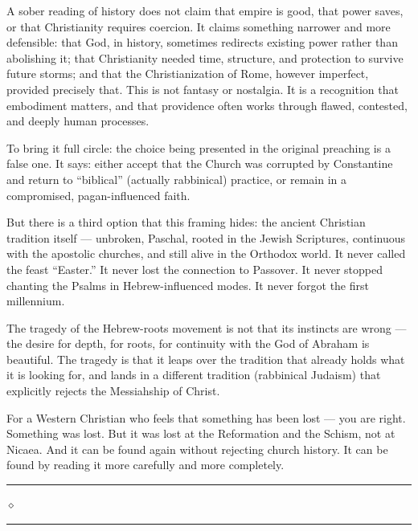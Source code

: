\documentclass[10pt,twoside,openany]{book}
\newcommand{\ornrule}{%
  \par\bigskip
  {\noindent\hfil{\color{gold}\rule[0.5ex]{1.5in}{0.5pt}%
  \quad$\diamond$\quad%
  \rule[0.5ex]{1.5in}{0.5pt}}\hfil\par}%
  \bigskip
}
\begin{document}
A sober reading of history does not claim that empire is good, that
power saves, or that Christianity requires coercion. It claims
something narrower and more defensible: that God, in history, sometimes
redirects existing power rather than abolishing it; that Christianity
needed time, structure, and protection to survive future storms; and
that the Christianization of Rome, however imperfect, provided
precisely that. This is not fantasy or nostalgia. It is a recognition
that embodiment matters, and that providence often works through flawed,
contested, and deeply human processes.

\begin{reviewerfinalbox}
To bring it full circle: the choice being presented in
the original preaching is a false one. It says: either
accept that the Church was corrupted by Constantine and
return to ``biblical'' (actually rabbinical) practice, or
remain in a compromised, pagan-influenced faith.

But there is a third option that this framing hides:
the ancient Christian tradition itself --- unbroken,
Paschal, rooted in the Jewish Scriptures, continuous
with the apostolic churches, and still alive in the
Orthodox world. It never called the feast ``Easter.'' It
never lost the connection to Passover. It never stopped
chanting the Psalms in Hebrew-influenced modes. It
never forgot the first millennium.

The tragedy of the Hebrew-roots movement is not that
its instincts are wrong --- the desire for depth, for
roots, for continuity with the God of Abraham is
beautiful. The tragedy is that it leaps over the
tradition that already holds what it is looking for,
and lands in a different tradition (rabbinical Judaism)
that explicitly rejects the Messiahship of Christ.

For a Western Christian who feels that something has
been lost --- you are right. Something was lost. But it
was lost at the Reformation and the Schism, not at
Nicaea. And it can be found again without rejecting
church history. It can be found by reading it more
carefully and more completely.
\end{reviewerfinalbox}

\ornrule




\appendix
\renewcommand{\thechapter}{\arabic{chapter}}
\setcounter{chapter}{0}
\end{document}
